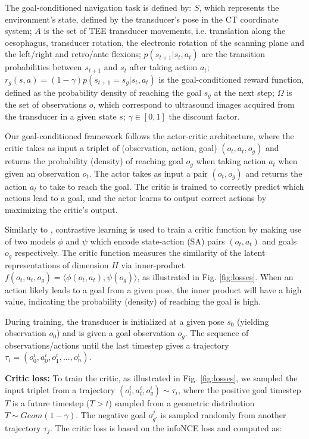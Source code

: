 The goal-conditioned navigation task is defined by: $S$, which represents the environment's state, defined by the transducer's pose in the CT coordinate system; $A$ is the set of TEE transducer movements, i.e. translation along the oesophagus, transducer rotation, the electronic rotation of the scanning plane and the left/right and retro/ante flexions; $p(s_{t+1}|s_t, a_t)$ are the transition probabilities between $s_{t+1}$ and $s_t$ after taking action $a_t$; $r_g(s, a) = (1 - \gamma)p(s_{t+1} = s_g | s_t, a_t)$ is the goal-conditioned reward function, defined as the probability density of reaching the goal $s_g$ at the next step; $\Omega$ is the set of observations $o$, which correspond to ultrasound images acquired from the transducer in a given state $s$; $\gamma \in [0, 1]$ the discount factor.

Our goal-conditioned framework follows the actor-critic architecture, where the critic takes as input a triplet of (observation, action, goal) $(o_t, a_t, o_g)$ and returns the probability (density) of reaching goal $o_g$ when taking action $a_t$ when given an observation $o_t$. The actor takes as input a pair $(o_t, o_g)$ and returns the action $a_t$ to take to reach the goal. The critic is trained to correctly predict which actions lead to a goal, and the actor learns to output correct actions by maximizing the critic's output.

Similarly to \cite{Eysenbach2022ContrastiveLA}, contrastive learning is used to train a critic function by making use of two models $\phi$ and $\psi$ which encode state-action (SA) pairs  $(o_t, a_t)$ and goals $o_g$ respectively. The critic function measures the similarity of the latent representations of dimension $H$ via inner-product $f(o_t, a_t, o_g) = \langle \phi(o_t, a_t), \psi(o_g) \rangle$, as illustrated in Fig. \ref{fig:losses}. When an action likely leads to a goal from a given pose, the inner product will have a high value, indicating the probability (density) of reaching the goal is high.

During training, the transducer is initialized at a given pose $s_0$ (yielding observation $o_0$) and is given a goal observation $o_g$. The sequence of observations/actions until the last timestep gives a trajectory $\tau_i = (o_0^i, a_0^i, o_1^i, ..., o_n^i)$.

\textbf{Critic loss:} To train the critic, as illustrated in Fig. \ref{fig:losses}, we sampled the input triplet from a trajectory $(o_t^i, a_t^i, o_g^i) \sim \tau_i$, where the positive goal timestep $T$ is a future timestep ($T > t$) sampled from a geometric distribution $T \sim Geom(1 - \gamma)$. The negative goal $o_{g'}^j$ is sampled randomly from another trajectory $\tau_j$. The critic loss is based on the infoNCE loss \cite{vanderoord2018} and computed as:

